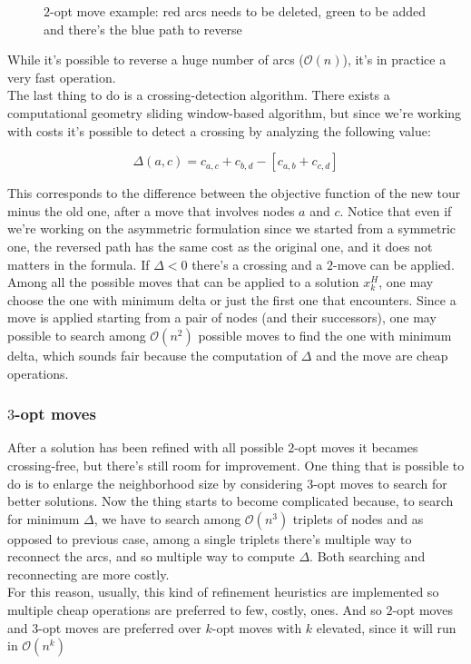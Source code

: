 \begin{figure}[h]
\begin{minipage}{.45\textwidth}
    \end{minipage}
    \caption[$2$-opt move example]{\centering $2$-opt move example: red arcs needs to be deleted, green
    to be added and there's the blue path to reverse}
\end{figure}

While it's possible to reverse a huge number of arcs ($\mathcal{O}(n)$), it's in
practice a very fast operation.\\
The last thing to do is a crossing-detection algorithm. There exists a
computational geometry sliding window-based algorithm, but since we're working
with costs it's possible to detect a crossing by analyzing the following value:

\begin{equation}
    \Delta(a,c) = c_{a,c} + c_{b,d} - [c_{a,b} + c_{c,d}]
\end{equation}

This corresponds to the difference between the objective function of the new
tour minus the old one, after a move that involves nodes $a$ and $c$. Notice
that even if we're working on the asymmetric formulation since we started from
a symmetric one, the reversed path has the same cost as the original one, and it
does not matters in the formula. If $\Delta < 0$ there's a crossing and a $2$-move can
be applied.\\
Among all the possible moves that can be applied to a solution $x^H_k$, one
may choose the one with minimum delta or just the first one that encounters.
Since a move is applied starting from a pair of nodes (and their successors),
one may possible to search among $\mathcal{O}(n^2)$ possible moves to find the
one with minimum delta, which sounds fair because the computation of $\Delta$
and the move are cheap operations.

\subsubsection{$3$-opt moves}
After a solution has been refined with all possible $2$-opt moves it becames
crossing-free, but there's still room for improvement. One thing that is
possible to do is to enlarge the neighborhood size by considering $3$-opt moves to
search for better solutions.  Now the thing starts to become complicated
because, to search for minimum $\Delta$, we have to search among
$\mathcal{O}(n^3)$ triplets of nodes and as opposed to previous case, among a
single triplets there's multiple way to reconnect the arcs, and so multiple way
to compute $\Delta$. Both searching and reconnecting are more costly.\\ 
For this reason, usually, this kind of refinement heuristics are implemented so
multiple cheap operations are preferred to few, costly, ones. And so $2$-opt moves
and $3$-opt moves are preferred over $k$-opt moves with $k$ elevated, since it will run
in $\mathcal{O}(n^k)$

